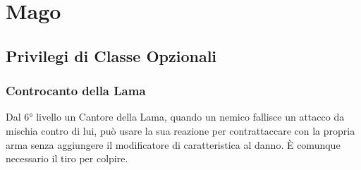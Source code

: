 \chapter{Mago}

\section{Privilegi di Classe Opzionali}

\subsection{Controcanto della Lama}

Dal 6° livello un Cantore della Lama, quando un nemico fallisce un attacco da mischia contro di lui, può usare la sua reazione per contrattaccare con la propria arma senza aggiungere il modificatore di caratteristica al danno. È comunque necessario il tiro per colpire.
